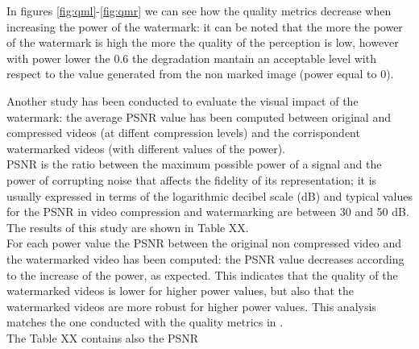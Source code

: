 In figures \ref{fig:qml}-\ref{fig:qmr} we can see how the quality metrics decrease when increasing the power of the watermark: it can be noted that the more the power of the watermark is high the more the quality of the perception is low, however with power lower the 0.6 the degradation mantain an acceptable level with respect to the value generated from the non marked image (power equal to 0).\newline

Another study has been conducted to evaluate the visual impact of the watermark: the average PSNR value has been computed between original and compressed videos (at diffent compression levels) and the corrispondent watermarked videos (with different values of the power).\\ 

PSNR is the ratio between the maximum possible power of a signal and the power of corrupting noise that affects the fidelity of its representation; it is usually expressed in terms of the logarithmic decibel scale (dB) and typical values for the PSNR in video compression and watermarking are between 30 and 50 dB.
The results of this study are shown in Table XX.\\
For each power value the PSNR between the original non compressed video and the watermarked video has been computed: the PSNR value decreases according to the increase of the power, as expected. This indicates that the quality of the watermarked videos is lower for higher power values, but also that the watermarked videos are more robust for higher power values. This analysis matches the one conducted with the quality metrics in \cite{QMETRICS}.\\
The Table XX contains also the PSNR



